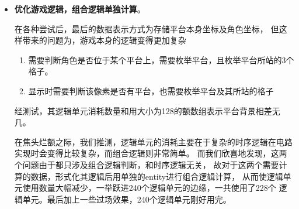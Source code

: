 \documentclass{article}
\begin{document}
\begin{spacing}{1.62}
\begin{itemize}
\begin{itemize}
				这样做的好处有
				\begin{enumerate}
					\item 角色是否在平台上的逻辑判断变得简洁
					\item 平台数量和逻辑单元消耗几乎无关（初始化时可能相关）
					\item 平台上升只需要位移操作即可
					\item 屏幕显示逻辑也变得简洁
				\end{enumerate}
				但同时也带来了劣势： 由于数组过大，初始化占用逻辑单元太多。

				首先，我们尝试先将数组全部赋值为'0'，再把少数为'1'的部分单独赋值，
				但这样逻辑单元消耗依然很大。

				经过查找资料，我们尝试使用MAX II芯片自带的{\bf User Flash Memory(UFM)}进行数据存储，并且
				在游戏初始化时读入数据。我们尝试了不同的UFM Megafunction: {\bf ALTUFM\_PARALLEL}
				及 {\bf ALTUFM\_SPI}，其中{\bf ALTUFM\_SPI}尝试了其{\bf Base mode}和{\bf Extended mode}，
				且都为Read only的访问模式，以期
				Megafunction所使用的逻辑单元加上使用UFM所耗逻辑单元的数量小于直接初始化数组
				消耗的数量。

				但实验结果表明，{\bf ALTUFM\_PARALLEL}由于需要对数组进行批量赋值而
				消耗逻辑单元较多；{\bf ALTUFM\_SPI}的{\bf Base mode}虽然本身使用逻辑单元较多，但一次处理数据
				量较少，{\bf Extended mode}虽然本身逻辑单元较少，但其一次处理数据量较大。
				最终没有一个组合能达到我们期望的效果。

				而反观需求，我们只初始化最开始的平台布局而不是需要大量的数据，比如
				播放动画或者音乐，故在几天的尝试后，
				最后遗憾地得出结论，此方法不适合使用。

			\item {\bf 优化游戏逻辑，组合逻辑单独计算}。

				在各种尝试后，最后的数据表示方式为存储平台本身坐标及角色坐标，
				但这样带来的问题为，游戏本身的逻辑变得更加复杂
				\begin{enumerate}
					\item 需要判断角色是否位于某个平台上，需要枚举平台，且枚举平台所站的3个格子。
					\item 显示时需要判断该像素是否有平台，也需要枚举平台及其所站的格子
				\end{enumerate}
				经测试，其逻辑单元消耗数量和用大小为128的额数组表示平台背景相差无几。
				
				在焦头烂额之际，我们推测，逻辑单元的消耗主要在于复杂的时序逻辑在电路
				实现时会变得比较复杂，而组合逻辑则非常简单。
				而我们欣喜地发现，这两个问题由于都只涉及组合逻辑判断，和时序逻辑无关，
				故对于这两个需要计算的数据，形式化其逻辑后用单独的entity进行组合逻辑计算，
				从而使逻辑单元使用数量大幅减少，一举跃进240个逻辑单元的边缘，一共使用了228个
				逻辑单元。最后加上一些过场效果，240个逻辑单元刚好用完。


\end{itemize}
\end{itemize}
\end{spacing}
\end{document}
